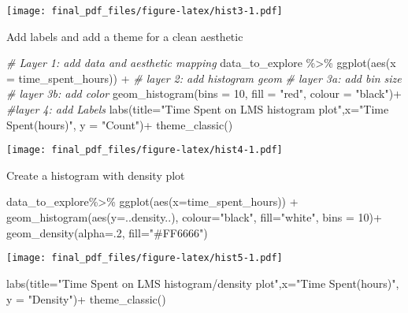 \documentclass[
]{article}
\newenvironment{Shaded}{\begin{snugshade}}{\end{snugshade}}
\newcommand{\AttributeTok}[1]{\textcolor[rgb]{0.77,0.63,0.00}{#1}}
\newcommand{\CommentTok}[1]{\textcolor[rgb]{0.56,0.35,0.01}{\textit{#1}}}
\newcommand{\DecValTok}[1]{\textcolor[rgb]{0.00,0.00,0.81}{#1}}
\newcommand{\FunctionTok}[1]{\textcolor[rgb]{0.00,0.00,0.00}{#1}}
\newcommand{\NormalTok}[1]{#1}
\newcommand{\SpecialCharTok}[1]{\textcolor[rgb]{0.00,0.00,0.00}{#1}}
\newcommand{\StringTok}[1]{\textcolor[rgb]{0.31,0.60,0.02}{#1}}
\begin{document}
\texttt{[image: final\_pdf\_files/figure-latex/hist3-1.pdf]}

Add labels and add a theme for a clean aesthetic

\begin{Shaded}
\begin{Highlighting}[]
\CommentTok{\# Layer 1: add data and aesthetic mapping}
\NormalTok{data\_to\_explore }\SpecialCharTok{\%\textgreater{}\%} 
  \FunctionTok{ggplot}\NormalTok{(}\FunctionTok{aes}\NormalTok{(}\AttributeTok{x =}\NormalTok{ time\_spent\_hours)) }\SpecialCharTok{+}
\CommentTok{\# layer 2: add histogram geom }
\CommentTok{\# layer 3a: add bin size}
\CommentTok{\# layer 3b: add color}
  \FunctionTok{geom\_histogram}\NormalTok{(}\AttributeTok{bins =} \DecValTok{10}\NormalTok{, }\AttributeTok{fill =} \StringTok{"red"}\NormalTok{, }\AttributeTok{colour =} \StringTok{"black"}\NormalTok{)}\SpecialCharTok{+}
\CommentTok{\#layer 4: add Labels}
  \FunctionTok{labs}\NormalTok{(}\AttributeTok{title=}\StringTok{"Time Spent on LMS histogram plot"}\NormalTok{,}\AttributeTok{x=}\StringTok{"Time Spent(hours)"}\NormalTok{, }\AttributeTok{y =} \StringTok{"Count"}\NormalTok{)}\SpecialCharTok{+}
  \FunctionTok{theme\_classic}\NormalTok{()}
\end{Highlighting}
\end{Shaded}

\texttt{[image: final\_pdf\_files/figure-latex/hist4-1.pdf]}

Create a histogram with density plot

\begin{Shaded}
\begin{Highlighting}[]
\NormalTok{data\_to\_explore}\SpecialCharTok{\%\textgreater{}\%}
  \FunctionTok{ggplot}\NormalTok{(}\FunctionTok{aes}\NormalTok{(}\AttributeTok{x=}\NormalTok{time\_spent\_hours)) }\SpecialCharTok{+}
  \FunctionTok{geom\_histogram}\NormalTok{(}\FunctionTok{aes}\NormalTok{(}\AttributeTok{y=}\NormalTok{..density..), }\AttributeTok{colour=}\StringTok{"black"}\NormalTok{, }\AttributeTok{fill=}\StringTok{"white"}\NormalTok{, }\AttributeTok{bins =} \DecValTok{10}\NormalTok{)}\SpecialCharTok{+}
 \FunctionTok{geom\_density}\NormalTok{(}\AttributeTok{alpha=}\NormalTok{.}\DecValTok{2}\NormalTok{, }\AttributeTok{fill=}\StringTok{"\#FF6666"}\NormalTok{) }
\end{Highlighting}
\end{Shaded}

\texttt{[image: final\_pdf\_files/figure-latex/hist5-1.pdf]}

\begin{Shaded}
\begin{Highlighting}[]
  \FunctionTok{labs}\NormalTok{(}\AttributeTok{title=}\StringTok{"Time Spent on LMS histogram/density plot"}\NormalTok{,}\AttributeTok{x=}\StringTok{"Time Spent(hours)"}\NormalTok{, }\AttributeTok{y =} \StringTok{"Density"}\NormalTok{)}\SpecialCharTok{+}
  \FunctionTok{theme\_classic}\NormalTok{()}
\end{Highlighting}
\end{Shaded}
\end{document}
